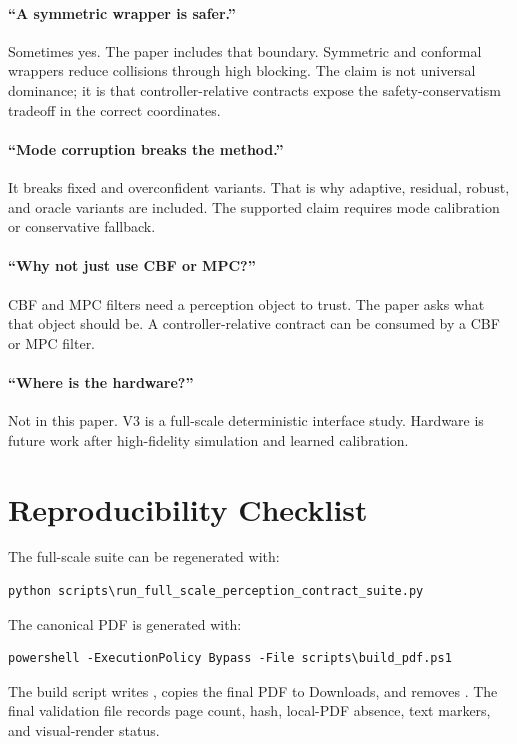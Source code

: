 \documentclass{article}
\begin{document}
\paragraph{``A symmetric wrapper is safer.''}
Sometimes yes. The paper includes that boundary. Symmetric and conformal wrappers reduce collisions through high blocking. The claim is not universal dominance; it is that controller-relative contracts expose the safety-conservatism tradeoff in the correct coordinates.

\paragraph{``Mode corruption breaks the method.''}
It breaks fixed and overconfident variants. That is why adaptive, residual, robust, and oracle variants are included. The supported claim requires mode calibration or conservative fallback.

\paragraph{``Why not just use CBF or MPC?''}
CBF and MPC filters need a perception object to trust. The paper asks what that object should be. A controller-relative contract can be consumed by a CBF or MPC filter.

\paragraph{``Where is the hardware?''}
Not in this paper. V3 is a full-scale deterministic interface study. Hardware is future work after high-fidelity simulation and learned calibration.

\clearpage
\section{Reproducibility Checklist}

The full-scale suite can be regenerated with:
\begin{verbatim}
python scripts\run_full_scale_perception_contract_suite.py
\end{verbatim}
The canonical PDF is generated with:
\begin{verbatim}
powershell -ExecutionPolicy Bypass -File scripts\build_pdf.ps1
\end{verbatim}
The build script writes , copies the final PDF to Downloads, and removes . The final validation file records page count, hash, local-PDF absence, text markers, and visual-render status.
\end{document}
